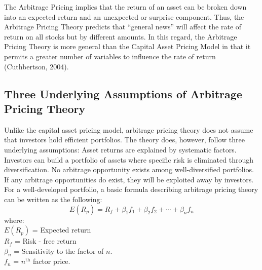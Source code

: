 \documentclass[a4 paper, 12pt]{report}
\theoremstyle{plain}
\begin{document}
\par The Arbitrage Pricing implies that the return of an asset can be broken down into an
expected return and an unexpected or surprise component. Thus, the Arbitrage Pricing
Theory predicts that ``general news'' will affect the rate of return on all stocks but by
different amounts. In this regard, the Arbitrage Pricing Theory is more general than the
Capital Asset Pricing Model in that it permits a greater number of variables to influence
the rate of return (Cuthbertson, 2004).
\subsection{Three Underlying Assumptions of Arbitrage Pricing Theory}
\noindent
\par Unlike the capital asset pricing model, arbitrage pricing theory does not assume that
investors hold efficient portfolios. The theory does, however, follow three underlying
assumptions: Asset returns are explained by systematic factors. Investors can build a
portfolio of assets where specific risk is eliminated through diversification. No arbitrage
opportunity exists among well-diversified portfolios. If any arbitrage opportunities do
exist, they will be exploited away by investors.\\

For a well-developed portfolio, a basic formula describing arbitrage pricing theory can be written as the following:
$$
E(R_p) = R_f+\beta_1f_1+\beta_2f_2+\cdots+\beta_nf_n
$$
where:\\
$E(R_p)$ = Expected return\\
$R_f$ = Risk - free return\\
$\beta_n$ = Sensitivity to the factor of $n$.\\
$f_n$ = $n^{\mbox{th}}$ factor price.\\
\end{document}
